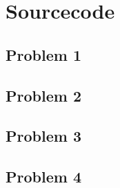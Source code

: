 \chapter{Sourcecode}

\section{Problem 1}


\section{Problem 2}


\section{Problem 3}


\section{Problem 4}

